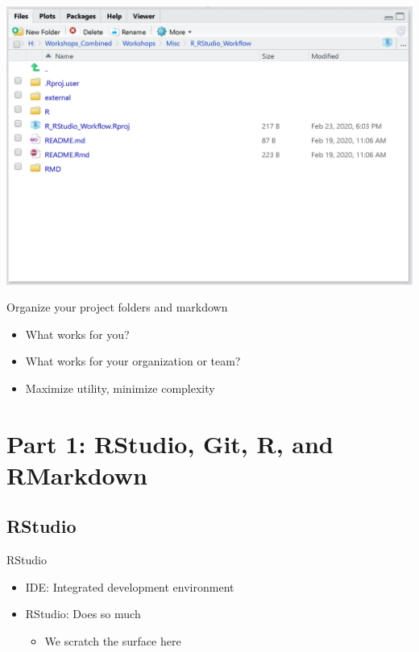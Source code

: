 \documentclass[
  ignorenonframetext,
]{beamer}
\providecommand{\tightlist}{%
  \setlength{\itemsep}{0pt}\setlength{\parskip}{0pt}}
\begin{document}
\begin{frame}

\includegraphics{../external/images/this_project.PNG}

\end{frame}

\begin{frame}{Organize your project folders and markdown}
\protect\hypertarget{organize-your-project-folders-and-markdown}{}

\begin{itemize}[<+->]
\tightlist
\item
  What works for you?
\item
  What works for your organization or team?
\item
  Maximize utility, minimize complexity
\end{itemize}

\end{frame}

\hypertarget{part-1-rstudio-git-r-and-rmarkdown}{%
\section{Part 1: RStudio, Git, R, and
RMarkdown}\label{part-1-rstudio-git-r-and-rmarkdown}}

\hypertarget{rstudio}{%
\subsection{RStudio}\label{rstudio}}

\begin{frame}{RStudio}
\protect\hypertarget{rstudio-1}{}

\begin{itemize}[<+->]
\tightlist
\item
  IDE: Integrated development environment
\item
  RStudio: Does so much

  \begin{itemize}[<+->]
  \tightlist
  \item
    We scratch the surface here
  \end{itemize}
\end{itemize}

\end{frame}
\end{document}
